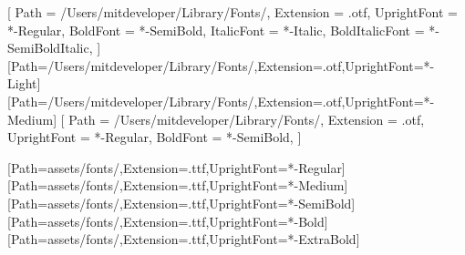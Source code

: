 
\usepackage[a4paper,top=2.1cm,bottom=2.3cm,left=2.15cm,right=2.15cm,headheight=26pt,headsep=16pt,footskip=32pt]{geometry}

\usepackage{fontspec}

\setmainfont{Geist}[
  Path = /Users/mitdeveloper/Library/Fonts/,
  Extension = .otf,
  UprightFont = *-Regular,
  BoldFont = *-SemiBold,
  ItalicFont = *-Italic,
  BoldItalicFont = *-SemiBoldItalic,
]
\newfontfamily{}[Path=/Users/mitdeveloper/Library/Fonts/,Extension=.otf,UprightFont=*-Light]
\newfontfamily{}[Path=/Users/mitdeveloper/Library/Fonts/,Extension=.otf,UprightFont=*-Medium]
\newfontfamily{}[
  Path = /Users/mitdeveloper/Library/Fonts/,
  Extension = .otf,
  UprightFont = *-Regular,
  BoldFont = *-SemiBold,
]

\newcommand{\fontpathAssets}{assets/fonts/}
\newfontfamily{}[Path=\fontpathAssets,Extension=.ttf,UprightFont=*-Regular]
\newfontfamily{}[Path=\fontpathAssets,Extension=.ttf,UprightFont=*-Medium]
\newfontfamily{}[Path=\fontpathAssets,Extension=.ttf,UprightFont=*-SemiBold]
\newfontfamily{}[Path=\fontpathAssets,Extension=.ttf,UprightFont=*-Bold]
\newfontfamily{}[Path=\fontpathAssets,Extension=.ttf,UprightFont=*-ExtraBold]

\usepackage{xcolor}
\color{cink}

\usepackage{graphicx}
\usepackage{enumitem}
\usepackage[most]{tcolorbox}
\usepackage{titlesec}
\usepackage{fancyhdr}
\usepackage{array}
\usepackage{longtable}
\usepackage{booktabs}
\usepackage{multicol}
\usepackage{eso-pic}
\usepackage[normalem]{ulem}
\usepackage[hidelinks,colorlinks=true,linkcolor=cblue,urlcolor=cblue,citecolor=cblue,breaklinks=true]{hyperref}
\usepackage{microtype}
\usepackage{parskip}
\setlength{\parskip}{0.55em}
\setlength{\parindent}{0pt}

